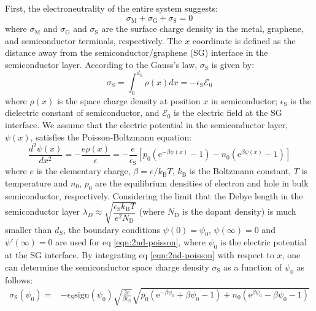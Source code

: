 \documentclass[journal=nalefd]{achemso}
\newcommand*\subs[1]{_{\text{#1}}} %
\begin{document}
First, the electroneutrality of the entire system suggests:
\begin{equation}
    \sigma\subs{M}+\sigma\subs{G}+\sigma\subs{S}=0
    \label{eqn:charge-balance}
\end{equation}
where $\sigma\subs{M}$ and $\sigma\subs{G}$ and $\sigma\subs{S}$ are the surface charge density in the metal, graphene, and semiconductor terminals, respectively.
The $x$ coordinate is defined as the distance away from the semiconductor/graphene (SG) interface in the semiconductor layer. According to the Gauss's law, $\sigma\subs{S}$ is given by:
\begin{equation}
    \sigma\subs{S} = \int_{0}^{d\subs{S}} \rho(x) dx = -\epsilon\subs{S} \mathscr{E}_0
    \label{eqn:sigma_S}
\end{equation}
where $\rho(x)$ is the space charge density at position $x$ in semiconductor; $\epsilon\subs{S}$ is the dielectric constant of semiconductor, and $\mathscr{E}_0$ is the electric field at the SG interface.
We assume that the electric potential in the semiconductor layer, $\psi(x)$, satisfies the Poisson-Boltzmann equation:
\begin{equation}
    \label{eqn:2nd-poisson}
    \frac{d^2 \psi(x)}{dx^2} = -\frac{e\rho(x)}{\epsilon} = - \frac{e}{\epsilon\subs{S}}[p_0(\text{e}^{-\beta \psi(x)}-1) - n_0(\text{e}^{\beta \psi(x)} -1)]
\end{equation}
where $e$ is the elementary charge, $\beta=e/k\subs{B} T$, $k\subs{B}$ is the Boltzmann constant, $T$ is temperature and $n_0$, $p_0$ are the equilibrium densities of electron and hole in bulk semiconductor, respectively.
Considering the limit that the Debye length in the semiconductor layer $\lambda_D\approx\sqrt{\dfrac{\epsilon\subs{S} k\subs{B} T}{e^2 N\subs{D}}}$ (where $N\subs{D}$ is the dopant density) is much smaller than $d_S$, the boundary conditions $\psi(0)=\psi_0$, $\psi(\infty)=0$ and $\psi'(\infty)=0$ are used for eq \ref{eqn:2nd-poisson}, where $\psi_0$ is the electric potential at the SG interface.
By integrating eq \ref{eqn:2nd-poisson} with respect to $x$, one can determine the semiconductor space charge density $\sigma\subs{S}$ as a function of $\psi_0$ as follows:
\begin{equation}
    \label{eqn:sigma_S_exact}
    \begin{aligned}
    \sigma\subs{S}(\psi_0) = &-\epsilon\subs{S} \mathrm{sign}(\psi_0)\sqrt{\frac{2e}{\beta \epsilon\subs{S}}} \sqrt{p_0(\text{e}^{-\beta\psi_0} + \beta \psi_0 -1) + n_0(\text{e}^{\beta\psi_0} - \beta \psi_0 -1) }
    \end{aligned}
\end{equation}
\end{document}
